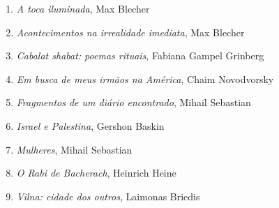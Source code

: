 


\begin{enumerate}
\setlength{\topsep}{2pt}
\setlength{\partopsep}{0pt}
\setlength\parskip{4.2pt}
\setlength\itemsep{-1.4mm}
\item \textit{A toca iluminada}, Max Blecher
\item \textit{Acontecimentos na irrealidade imediata}, Max Blecher
\item \textit{Cabalat shabat: poemas rituais}, Fabiana Gampel Grinberg
\item \textit{Em busca de meus irmãos na América}, Chaim Novodvorsky
\item \textit{Fragmentos de um diário encontrado}, Mihail Sebastian
\item \textit{Israel e Palestina}, Gershon Baskin
\item \textit{Mulheres}, Mihail Sebastian
\item \textit{O Rabi de Bacherach}, Heinrich Heine
\item \textit{Vilna: cidade dos outros}, Laimonas Briedis
\end{enumerate}






